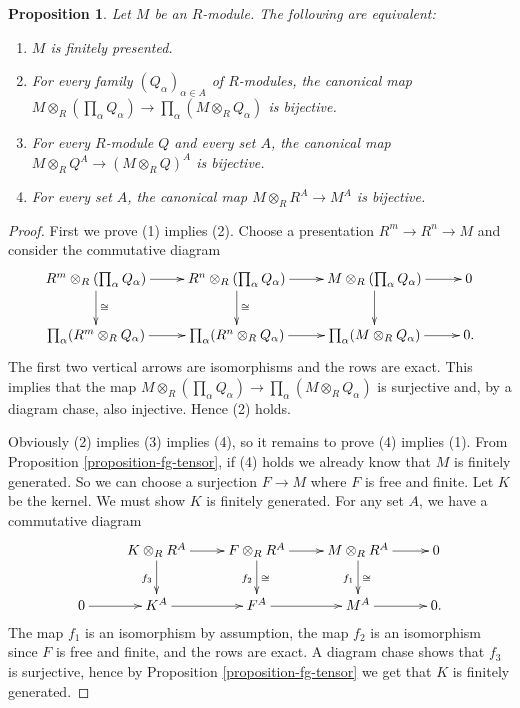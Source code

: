 \documentclass{amsart}
\theoremstyle{plain}
\newtheorem{proposition}[subsection]{Proposition}
\theoremstyle{definition}
\theoremstyle{remark}
\numberwithin{equation}{subsection}
\begin{document}
\begin{proposition}
\label{proposition-fp-tensor}
Let $M$ be an $R$-module.  The following are equivalent:
\begin{enumerate}
\item $M$ is finitely presented.
\item For every family $(Q_{\alpha})_{\alpha \in A}$ of $R$-modules, the
canonical map $M \otimes_R \left( \prod_{\alpha} Q_{\alpha} \right)
\to \prod_{\alpha} (M \otimes_R Q_{\alpha})$ is bijective.
\item For every $R$-module $Q$ and every set $A$, the canonical map $M
\otimes_R Q^{A} \to (M \otimes_R Q)^{A}$ is bijective.
\item For every set $A$, the canonical map $M \otimes_R R^{A} \to
M^{A}$ is bijective.
\end{enumerate}
\end{proposition}

\begin{proof}
First we prove (1) implies (2).  Choose a presentation $R^m \to R^n
\to M$ and consider the commutative diagram
$$
\xymatrix{
R^m \otimes_R (\prod_{\alpha} Q_{\alpha}) \ar[r] \ar[d]^{\cong} & R^n
\otimes_R (\prod_{\alpha} Q_{\alpha}) \ar[r] \ar[d]^{\cong} & M \otimes_R
(\prod_{\alpha} Q_{\alpha}) \ar[r] \ar[d] & 0 \\
\prod_{\alpha} (R^m \otimes_R Q_{\alpha}) \ar[r] & \prod_{\alpha} (R^n
\otimes_R Q_{\alpha}) \ar[r] & \prod_{\alpha} (M \otimes_R Q_{\alpha})
\ar[r] & 0.
}
$$
The first two vertical arrows are isomorphisms and the rows are exact.  This
implies that the map
$M \otimes_R (\prod_{\alpha} Q_{\alpha}) \to
\prod_{\alpha} ( M \otimes_R Q_{\alpha})$
is surjective and, by a diagram chase, also injective.  Hence (2) holds.

\medskip\noindent
Obviously (2) implies (3) implies (4), so it remains to prove (4) implies (1).
From Proposition \ref{proposition-fg-tensor}, if (4) holds we already know that
$M$ is finitely generated.  So we can choose a surjection $F \to M$
where $F$ is free and finite.  Let $K$ be the kernel.  We must show $K$ is
finitely generated.  For any set $A$, we have a commutative diagram
$$
\xymatrix{
& K \otimes_R R^A \ar[r] \ar[d]_{f_3} & F \otimes_R R^A \ar[r]
\ar[d]_{f_2}^{\cong} & M \otimes_R R^A \ar[r] \ar[d]_{f_1}^{\cong} & 0 \\
0 \ar[r] & K^A \ar[r] & F^A \ar[r] & M^A \ar[r] & 0 .
}
$$
The map $f_1$ is an isomorphism by assumption, the map $f_2$ is an isomorphism
since $F$ is free and finite, and the rows are exact.  A diagram chase shows
that $f_3$ is surjective, hence by Proposition \ref{proposition-fg-tensor} we
get that $K$ is finitely generated.
\end{proof}
\end{document}
